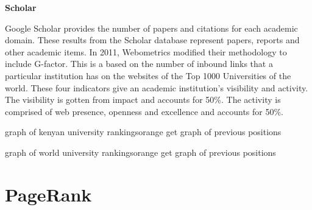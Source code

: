 \noindent
\textbf{Scholar}

\noindent
Google Scholar provides the number of papers and citations for each academic domain. These results from the Scholar database represent papers, reports and other academic items.
In 2011, Webometrics modified their methodology to include G-factor. This is a based on the number of inbound links that a particular institution has on the websites of the Top 1000 Universities of the world.
These four indicators give an academic institution’s visibility and activity. The visibility is gotten from
impact and accounts for 50\%. The activity is comprised of web presence, openness and excellence
and accounts for 50\%.

\begin{review_comment}{graph of kenyan university rankings}{orange}
{get graph of previous positions}
\end{review_comment}

\begin{review_comment}{graph of world university rankings}{orange}
{get graph of previous positions}
\end{review_comment}


\section{PageRank}
